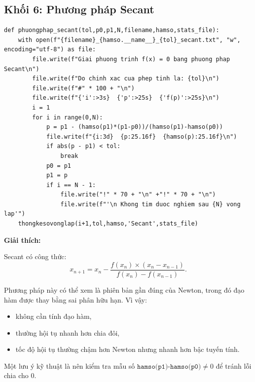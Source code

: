 \documentclass{article}
\begin{document}
\subsection{Khối 6: Phương pháp Secant}
\begin{lstlisting}[style=mypython,caption={Cài đặt phương pháp Secant}]
def phuongphap_secant(tol,p0,p1,N,filename,hamso,stats_file):
    with open(f"{filename}_{hamso.__name__}_{tol}_secant.txt", "w", encoding="utf-8") as file:
        file.write(f"Giai phuong trinh f(x) = 0 bang phuong phap Secant\n")
        file.write(f"Do chinh xac cua phep tinh la: {tol}\n")
        file.write(f"#" * 100 + "\n")
        file.write(f"{'i':>3s}  {'p':>25s}  {'f(p)':>25s}\n")
        i = 1
        for i in range(0,N):
            p = p1 - (hamso(p1)*(p1-p0))/(hamso(p1)-hamso(p0))
            file.write(f"{i:3d}  {p:25.16f}  {hamso(p):25.16f}\n")
            if abs(p - p1) < tol:
                break
            p0 = p1
            p1 = p
            if i == N - 1:
                file.write("!" * 70 + "\n" +"!" * 70 + "\n")
                file.write(f"'\n Khong tim duoc nghiem sau {N} vong lap'")
    thongkesovonglap(i+1,tol,hamso,'Secant',stats_file)
\end{lstlisting}

\textbf{Giải thích:}

Secant có công thức:
\[
x_{n+1}=x_n-\frac{f(x_n)\times (x_n-x_{n-1})}{f(x_n)-f(x_{n-1})}.
\]

Phương pháp này có thể xem là phiên bản gần đúng của Newton, trong đó đạo hàm được thay bằng sai phân hữu hạn. Vì vậy:
\begin{itemize}
    \item không cần tính đạo hàm,
    \item thường hội tụ nhanh hơn chia đôi,
    \item tốc độ hội tụ thường chậm hơn Newton nhưng nhanh hơn bậc tuyến tính.
\end{itemize}

Một lưu ý kỹ thuật là nên kiểm tra mẫu số \(\texttt{hamso(p1)-hamso(p0)}\neq 0\) để tránh lỗi chia cho 0.

\end{document}

